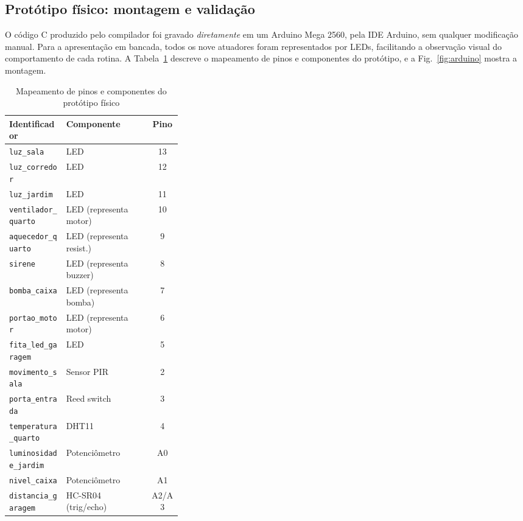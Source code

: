 \documentclass[conference]{IEEEtran}
\begin{document}
\subsection{Protótipo físico: montagem e validação}

O código C produzido pelo compilador foi gravado \emph{diretamente} em um
Arduino Mega 2560, pela IDE Arduino, sem qualquer modificação manual. Para
a apresentação em bancada, todos os nove atuadores foram representados por
LEDs, facilitando a observação visual do comportamento de cada rotina. A
Tabela~\ref{tab:hardware} descreve o mapeamento de pinos e componentes do
protótipo, e a Fig.~\ref{fig:arduino} mostra a montagem.

\begin{table}[htbp]
\caption{Mapeamento de pinos e componentes do protótipo físico}
\label{tab:hardware}
\centering
\begin{tabular}{p{0.33\linewidth}lc}
\toprule
\textbf{Identificador} & \textbf{Componente} & \textbf{Pino} \\
\midrule
\texttt{luz\_sala}          & LED                  & 13 \\
\texttt{luz\_corredor}      & LED                  & 12 \\
\texttt{luz\_jardim}        & LED                  & 11 \\
\texttt{ventilador\_quarto} & LED (representa motor)& 10 \\
\texttt{aquecedor\_quarto}  & LED (representa resist.) & 9 \\
\texttt{sirene}             & LED (representa buzzer)  & 8 \\
\texttt{bomba\_caixa}       & LED (representa bomba)   & 7 \\
\texttt{portao\_motor}      & LED (representa motor)   & 6 \\
\texttt{fita\_led\_garagem} & LED                  &  5 \\
\texttt{movimento\_sala}    & Sensor PIR           &  2 \\
\texttt{porta\_entrada}     & Reed switch          &  3 \\
\texttt{temperatura\_quarto}& DHT11                &  4 \\
\texttt{luminosidade\_jardim}& Potenciômetro       & A0 \\
\texttt{nivel\_caixa}       & Potenciômetro        & A1 \\
\texttt{distancia\_garagem} & HC-SR04 (trig/echo)  & A2/A3 \\
\bottomrule
\end{tabular}
\end{table}
\end{document}
